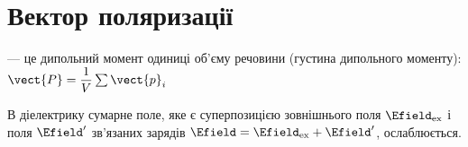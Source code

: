 \section{Вектор поляризації}

 --- це дипольний момент одиниці об'єму
речовини (густина
дипольного моменту):
$
	\vect{P} = \dfrac1V \sum \vect{p}_i
$

В діелектрику сумарне поле, яке є суперпозицією зовнішнього поля $\Efield_\text{ex}$ і поля
$\Efield'$ зв'язаних зарядів $\Efield = \Efield_\text{ex} + \Efield'$, ослаблюється.


